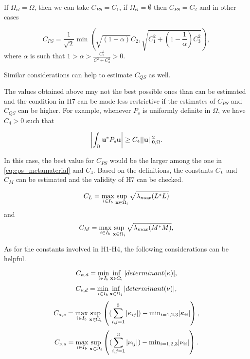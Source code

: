 If $\Omega_{el}=\Omega$, then we can take $C_{PS} = C_1$, if 
$\Omega_{el} = \emptyset$ then $C_{PS} = C_2$ and in other cases

  \begin{equation} \label{eq:cps_metamaterial}
    C_{PS} = 
      \frac{1}{\sqrt{2}} 
      \min 
      \left( 
        \sqrt{(1-\alpha)} C_2, \sqrt{C_1^2+(1-\frac{1}{\alpha}) C_3^2}
      \right),
  \end{equation}
  where $\alpha$ is such that 
  $1 > \alpha > \frac{C_3^2}{C_1^2+C_3^2} > 0$.

Similar considerations can help to estimate $C_{QS}$ as well.

The values obtained above may not the best possible ones than can 
be estimated and the 
condition in H7 can be made less restrictive 
if the estimates of $C_{PS}$ and $C_{QS}$ can be higher.
For example, whenever $P_s$ is uniformly definite 
in $\Omega$, we have $C_4 >0$ such that

\begin{equation} \label{eq:c4_constant}
  \left| \int_{\Omega} {\bf u}^*P_s{\bf u} \right| 
  \geq 
  C_4||{\bf u}||^2_{0,\Omega}.
\end{equation}

In this case, the best value for $C_{PS}$ would be the 
larger among the one in \eqref{eq:cps_metamaterial} and $C_4$.
Based on the definitions, the constants $C_L$ and $C_M$ can
be  estimated and the validity of H7 can be checked.

\begin{equation} \label{equation_for_CL}
  C_L = 
    \max_{i \in I_b} 
    \sup_{{\bf x} \in \Omega_i} \sqrt{\lambda_{max}(L^* L)} 
\end{equation}
%
and 
%
\begin{equation} \label{equation_for_CM}
  C_M = 
    \max_{i \in I_b} 
    \sup_{{\bf x} \in \Omega_i} \sqrt{\lambda_{max}(M^* M)},
\end{equation}

As for the constants involved in H1-H4,  the following considerations
can be helpful.

\begin{equation} \label{equation_for_C_kd}
  C_{\kappa, d} = 
    \min_{i \in I_b} \inf_{{\bf x} \in \Omega_i} 
    |determinant(\kappa)|,
\end{equation}
%
\begin{equation} \label{equation_for_C_nud}
  C_{\nu, d} = 
    \min_{i \in I_b} \inf_{{\bf x} \in \Omega_i} 
    |determinant(\nu)|,
\end{equation}
%
\begin{equation} \label{equation_for_C_ks}
  C_{\kappa,s} = 
    \max_{i \in I_b} \sup_{{\bf x} \in \Omega_i} 
      \left((\sum_{i,j=1}^3|\kappa_{ij}|)-\mathrm{min}_{i=1,2,3}|\kappa_{ii}| \right),
\end{equation}
%
\begin{equation} \label{equation_for_C_nus}
  C_{\nu,s} = 
    \max_{i \in I_b} \sup_{{\bf x} \in \Omega_i} 
    \left((\sum_{i,j=1}^3|\nu_{ij}|)-\mathrm{min}_{i=1,2,3}|\nu_{ii}| \right).
\end{equation}
%

